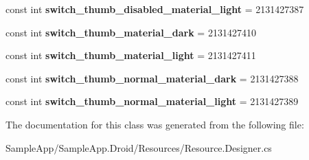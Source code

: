 \begin{DoxyCompactItemize}
\item 
\mbox{\label{class_sample_app_1_1_droid_1_1_resource_1_1_color_af33ed074c1517e0574b8e2b58477c228}} 
const int {\bfseries switch\+\_\+thumb\+\_\+disabled\+\_\+material\+\_\+light} = 2131427387
\item 
\mbox{\label{class_sample_app_1_1_droid_1_1_resource_1_1_color_a22288bbaf5a596d56da5e88d00adc0fb}} 
const int {\bfseries switch\+\_\+thumb\+\_\+material\+\_\+dark} = 2131427410
\item 
\mbox{\label{class_sample_app_1_1_droid_1_1_resource_1_1_color_ad43006b69c5c353318e90a1bec7c37a4}} 
const int {\bfseries switch\+\_\+thumb\+\_\+material\+\_\+light} = 2131427411
\item 
\mbox{\label{class_sample_app_1_1_droid_1_1_resource_1_1_color_a81334fa3460353d464c54788e3adaee9}} 
const int {\bfseries switch\+\_\+thumb\+\_\+normal\+\_\+material\+\_\+dark} = 2131427388
\item 
\mbox{\label{class_sample_app_1_1_droid_1_1_resource_1_1_color_a590e3204ef4e50b5f6d55bf782f87ffb}} 
const int {\bfseries switch\+\_\+thumb\+\_\+normal\+\_\+material\+\_\+light} = 2131427389
\end{DoxyCompactItemize}


The documentation for this class was generated from the following file\+:\begin{DoxyCompactItemize}
\item 
Sample\+App/\+Sample\+App.\+Droid/\+Resources/Resource.\+Designer.\+cs\end{DoxyCompactItemize}
